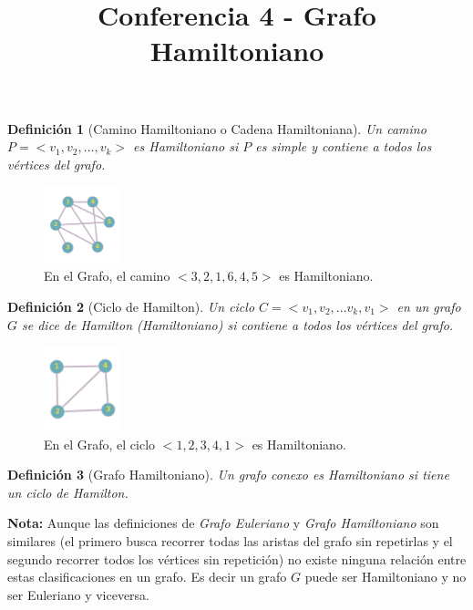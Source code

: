 \documentclass[a4paper,1pt]{report}
\title{Conferencia 4 - Grafo Hamiltoniano}
\author{}
\newtheorem*{dfn}{Definición}
\begin{document}
\maketitle

\begin{dfn}[Camino Hamiltoniano o Cadena Hamiltoniana]
    Un camino $P = <v_1, v_2,..., v_k>$ es Hamiltoniano si $P$ es simple y contiene a todos los v\'ertices del grafo.
\end{dfn}

\begin{figure}[H]
    \centering
    \includegraphics[width=0.2\textwidth]{figures4/G0.png}
    \caption{En el Grafo, el camino $<3,2,1,6,4,5>$ es Hamiltoniano.}
\end{figure} 



\begin{dfn}[Ciclo de Hamilton]
    Un ciclo $C = <v_1, v_2, ... v_k, v_1>$ en un grafo $G$ se dice de Hamilton (Hamiltoniano) si contiene a todos los v\'ertices del grafo.
\end{dfn}


\begin{figure}[H]
    \centering
    \includegraphics[width=0.2\textwidth]{figures4/SiHnoE.png}
    \caption{En el Grafo, el ciclo $<1,2,3,4,1>$ es Hamiltoniano.}
\end{figure} 

\begin{dfn}[Grafo Hamiltoniano]
    Un grafo conexo es Hamiltoniano si tiene un ciclo de Hamilton.
\end{dfn}


\textbf{Nota:} Aunque las definiciones de \textit{Grafo Euleriano} y \textit{Grafo Hamiltoniano} son similares (el primero busca recorrer todas las aristas del grafo sin repetirlas y el segundo recorrer todos los v\'ertices sin repetici\'on) no existe ninguna relaci\'on entre estas clasificaciones en un grafo. Es decir un grafo $G$ puede ser Hamiltoniano y no ser Euleriano y viceversa.
\end{document}
